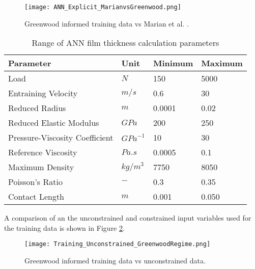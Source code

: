 \begin{figure}
	\centering  
	\texttt{[image: ANN\_Explicit\_MarianvsGreenwood.png]}
	\caption[Greenwood informed training data vs Marian et al.]{Greenwood informed training data vs Marian et al. \cite{Marian2022}.}
	\label{Greenwood informed training data vs Marian et al.}
\end{figure} 

\begin{table*}
	\caption{Range of ANN film thickness calculation parameters}
	\label{Range of ANN film thickness calculation parameters}
	\centering
	\renewcommand{\arraystretch}{1.5}%
	\begin{tabular}{|P{0.4\textwidth}|P{0.15\textwidth}|P{0.15\textwidth}|P{0.15\textwidth}|}
		\hline
		\textbf{Parameter} & \textbf{Unit} & \textbf{Minimum} & \textbf{Maximum} \\ [0.5ex]
		\hline
		Load & $N$ & 150 & 5000 \\ [0.5ex]
		\hline
		Entraining Velocity & $m/s$ & 0.6 & 30 \\ [0.5ex]
		\hline
		Reduced Radius & $m$ & 0.0001 & 0.02 \\ [0.5ex]
		\hline
		Reduced Elastic Modulus & $GPa$ & 200 & 250 \\ [0.5ex]
		\hline
		Pressure-Viscosity Coefficient & ${GPa}^{-1}$ & 10 & 30 \\ [0.5ex]
		\hline
		Reference Viscosity & $Pa.s$ & 0.0005 & 0.1 \\ [0.5ex]
		\hline
		Maximum Density & ${kg}/{m}^3$ & 7750 & 8050 \\ [0.5ex]
		\hline
		Poisson's Ratio & $-$ & 0.3 & 0.35 \\ [0.5ex]
		\hline
		Contact Length & $m$ & 0.001 & 0.050 \\ [0.5ex]
		\hline
		
	\end{tabular}
\end{table*}

A comparison of an the unconstrained and constrained input variables used for the training data is shown in Figure \ref{Training_Unconstrained_GreenwoodRegime}.

\begin{figure}
	\centering  
	\texttt{[image: Training\_Unconstrained\_GreenwoodRegime.png]}
	\caption{Greenwood informed training data vs unconstrained data.}
	\label{Training_Unconstrained_GreenwoodRegime}
\end{figure} 









